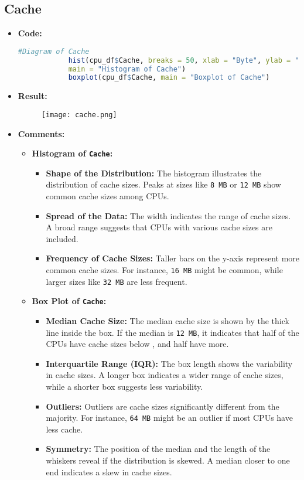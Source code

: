 \documentclass{article}
\begin{document}
	\subsection{Cache}
	\begin{itemize}
		\item \textbf{Code:}
		\begin{lstlisting}[basicstyle=\ttfamily, frame=single,language=R]
			#Diagram of Cache
			hist(cpu_df$Cache, breaks = 50, xlab = "Byte", ylab = "Frequency", ylim = c(0, 600),
			main = "Histogram of Cache")
			boxplot(cpu_df$Cache, main = "Boxplot of Cache")
		\end{lstlisting}
		\item \textbf{Result:}
		\begin{figure}[h]
			\centering
			\texttt{[image: cache.png]}  %
			\label{fig:enter-label}
		\end{figure}
		\item \textbf{Comments:}
		\begin{itemize}
			\item \textbf{Histogram of \texttt{Cache}:}
			\begin{itemize}
				\item \textbf{Shape of the Distribution:} The histogram illustrates the distribution of cache sizes. Peaks at sizes like \texttt{8 MB} or \texttt{12 MB} show common cache sizes among CPUs.
				\item \textbf{Spread of the Data:} The width indicates the range of cache sizes. A broad range suggests that CPUs with various cache sizes are included.
				\item \textbf{Frequency of Cache Sizes:} Taller bars on the y-axis represent more common cache sizes. For instance, \texttt{16 MB} might be common, while larger sizes like \texttt{32 MB} are less frequent.
			\end{itemize}
			\item \textbf{Box Plot of \texttt{Cache}:}
			\begin{itemize}
				\item \textbf{Median Cache Size:} The median cache size is shown by the thick line inside the box. If the median is \texttt{12 MB}, it indicates that half of the CPUs have cache sizes below , and half have more.
				\item \textbf{Interquartile Range (IQR):} The box length shows the variability in cache sizes. A longer box indicates a wider range of cache sizes, while a shorter box suggests less variability.
				\item \textbf{Outliers:} Outliers are cache sizes significantly different from the majority. For instance, \texttt{64 MB} might be an outlier if most CPUs have less cache.
				\item \textbf{Symmetry:} The position of the median and the length of the whiskers reveal if the distribution is skewed. A median closer to one end indicates a skew in cache sizes.
			\end{itemize}
		\end{itemize}
	\end{itemize}
\end{document}
